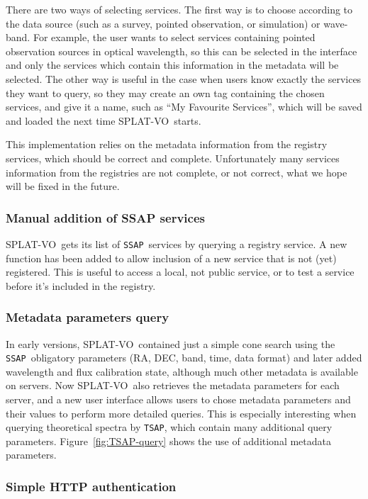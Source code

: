 \documentclass[final,authoryear,5p,times,twocolumn]{elsarticle}
\newcommand{\ssap}{\texttt{SSAP}}
\newcommand{\tsap}{\texttt{TSAP}}
\newcommand{\splatvo}{{\textsf{\small{SPLAT-VO}}}}
\begin{document}
There are two ways of selecting services. The first way is to choose according
to the data source (such as a survey, pointed observation, or simulation) or
wave-band.  For example, the user wants to select services containing pointed
observation sources in optical wavelength, so this can be selected in the
interface and only the services which contain this information in the metadata
will be selected.  The other way is useful in the case when users know exactly
the services they want to query, so they may create an own tag containing the
chosen services, and give it a name, such as ``My Favourite Services'', which
will be saved and loaded the next time \splatvo\ starts.

This implementation relies on the metadata information from the registry
services, which should be correct and complete. Unfortunately many services
information from the registries are not complete, or not correct, what we hope
will be fixed in the future.

\subsubsection{Manual addition of SSAP services}

\splatvo\ gets its list of \ssap\ services by querying a registry service.  A
new function has been added to allow inclusion of a new service that is not
(yet) registered. This is useful to access a local, not public service, or to
test a service before it's included in the registry.

\subsubsection{Metadata parameters query}

In early versions, \splatvo\ contained just a simple cone search using the
\ssap\ obligatory parameters (RA, DEC, band, time, data format) and later added
wavelength and flux calibration state, although much other metadata is
available on servers.  Now \splatvo\ also retrieves the metadata parameters for
each server, and a new user interface allows users to chose metadata parameters
and their values to perform more detailed queries.  This is especially
interesting when querying theoretical spectra by \tsap, which contain many
additional query parameters. Figure~\ref{fig:TSAP-query} shows the use of
additional metadata parameters.

\subsubsection{Simple HTTP authentication}
\end{document}

